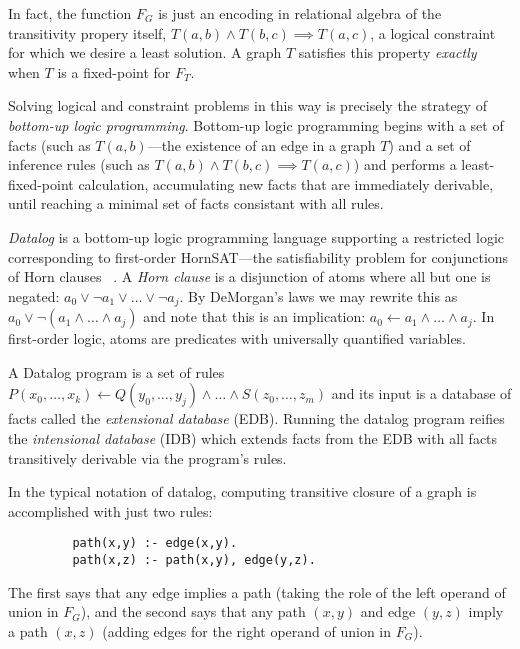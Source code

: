 In fact, the function $F_G$ is just an encoding in relational algebra of the transitivity propery itself, $T(a,b) \wedge T(b,c) \implies T(a,c)$, a logical constraint for which we desire a least solution. A graph $T$ satisfies this property \emph{exactly} when $T$ is a fixed-point for $F_T$.

Solving logical and constraint problems in this way is precisely the strategy of \emph{bottom-up logic programming}. Bottom-up logic programming begins with a set of facts (such as $T(a,b)$---the existence of an edge in a graph $T$) and a set of inference rules (such as $T(a,b) \wedge T(b,c) \implies T(a,c)$) and performs a least-fixed-point calculation, accumulating new facts that are immediately derivable, until reaching a minimal set of facts consistant with all rules.

\emph{Datalog} is a bottom-up logic programming language supporting a restricted logic corresponding to first-order HornSAT---the satisfiability problem for conjunctions of Horn clauses ~\cite{abiteboul1995foundations}. A \emph{Horn clause} is a disjunction of atoms where all but one is negated: $a_0 \vee \neg a_1 \vee \ldots \vee \neg a_j$. By DeMorgan's laws we may rewrite this as $a_0 \vee \neg (a_1 \wedge \ldots \wedge a_j)$ and note that this is an implication: $a_0 \leftarrow a_1 \wedge \ldots \wedge a_j$. In first-order logic, atoms are predicates with universally quantified variables.

A Datalog program is a set of rules $P(x_0,\ldots,x_k) \leftarrow Q(y_0,\ldots,y_j) \wedge \ldots \wedge S(z_0,\ldots,z_m)$ and its input is a database of facts called the \emph{extensional database} (EDB). Running the datalog program reifies the \emph{intensional database} (IDB) which extends facts from the EDB with all facts transitively derivable via the program's rules.

In the typical notation of datalog, computing transitive closure of a graph is accomplished with just two rules:

\begin{verbatim}
         path(x,y) :- edge(x,y).
         path(x,z) :- path(x,y), edge(y,z).
\end{verbatim}

The first says that any edge implies a path (taking the role of the left operand of union in $F_G$), and the second says that any path $(x,y)$ and edge $(y,z)$ imply a path $(x,z)$ (adding edges for the right operand of union in $F_G$).

